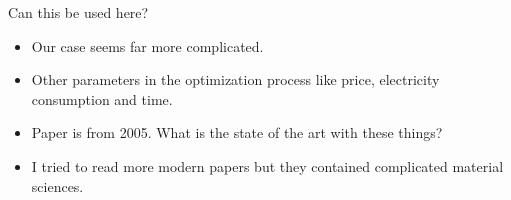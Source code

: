 \documentclass{beamer}
\begin{document}
	\begin{frame}{Can this be used here?}
		\begin{itemize}
			\pause
			\item Our case seems far more complicated.
			\pause
			\item Other parameters in the optimization process like price, electricity consumption and time.
			\pause
			\item Paper is from 2005. What is the state of the art with these things?
			\pause
			\item I tried to read more modern papers but they contained complicated material sciences.
		\end{itemize}
	\end{frame}
	
	\begin{frame}
		\printbibliography
	\end{frame} 
\end{document}

